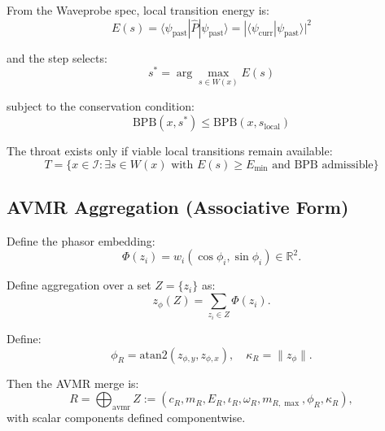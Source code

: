 \documentclass[11pt,a4paper]{article}
\begin{document}
From the Waveprobe spec, local transition energy is:
\begin{equation}
E(s) = \langle \psi_{\mathrm{past}} | \hat{P} | \psi_{\mathrm{past}} \rangle = |\langle \psi_{\mathrm{curr}} | \psi_{\mathrm{past}} \rangle|^2
\label{eq:waveprobe_energy}
\end{equation}

and the step selects:
\begin{equation}
s^* = \arg\max_{s \in W(x)} E(s)
\label{eq:waveprobe_selection}
\end{equation}

subject to the conservation condition:
\begin{equation}
\mathrm{BPB}(x, s^*) \leq \mathrm{BPB}(x, s_{\mathrm{local}})
\label{eq:bpb_conservation}
\end{equation}

The throat exists only if viable local transitions remain available:
\begin{equation}
T = \{ x \in \mathcal{I} : \exists s \in W(x) \text{ with } E(s) \geq E_{\min} \text{ and BPB admissible} \}
\label{eq:throat_waveprobe}
\end{equation}

\subsection{AVMR Aggregation (Associative Form)}

Define the phasor embedding:
\begin{equation}
\Phi(z_i) = w_i (\cos\phi_i, \sin\phi_i) \in \mathbb{R}^2.
\label{eq:phasor_embedding}
\end{equation}

Define aggregation over a set $Z = \{z_i\}$ as:
\begin{equation}
z_\phi(Z) = \sum_{z_i \in Z} \Phi(z_i).
\label{eq:phasor_aggregation}
\end{equation}

Define:
\begin{equation}
\phi_R = \mathrm{atan2}(z_{\phi,y}, z_{\phi,x}), \quad
\kappa_R = \|z_\phi\|.
\label{eq:phase_coherence}
\end{equation}

Then the AVMR merge is:
\begin{equation}
R = \bigoplus_{\mathrm{avmr}} Z := (c_R, m_R, E_R, \iota_R, \omega_R, m_{R,\max}, \phi_R, \kappa_R),
\label{eq:avmr_merge}
\end{equation}
with scalar components defined componentwise.
\end{document}
